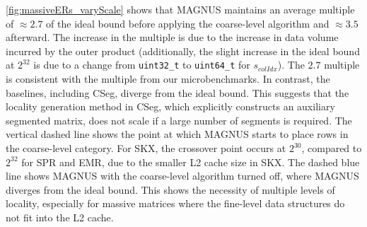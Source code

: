 \autoref{fig:massiveERs_varyScale} shows that MAGNUS maintains an average multiple of $\approx 2.7$ of the ideal bound before applying the coarse-level algorithm and $\approx 3.5$ afterward.
The increase in the multiple is due to the increase in data volume incurred by the outer product (additionally, the slight increase in the ideal bound at $2^{32}$ is due to a change from \texttt{uint32\_t} to \texttt{uint64\_t} for $s_{colIdx}$).
The $2.7$ multiple is consistent with the multiple from our microbenchmarks.
In contrast, the baselines, including CSeg, diverge from the ideal bound.
This suggests that the locality generation method in CSeg, which explicitly constructs an auxiliary segmented matrix, does not scale if a large number of segments is required.
The vertical dashed line shows the point at which MAGNUS starts to place rows in the coarse-level category.
For SKX, the crossover point occurs at $2^{30}$, compared to $2^{32}$ for SPR and EMR, due to the smaller L2 cache size in SKX.
The dashed blue line shows MAGNUS with the coarse-level algorithm turned off, where MAGNUS diverges from the ideal bound.
This shows the necessity of multiple levels of locality, especially for massive matrices where the fine-level data structures do not fit into the L2 cache.